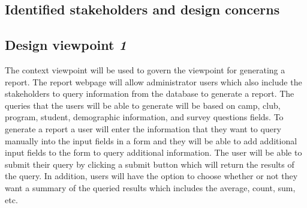 \documentclass[letterpaper,10pt,serif, draftclsnofoot,onecolumn, compsoc, titlepage]{IEEEtran}
\begin{document}
\subsection{Identified stakeholders and design concerns} 


\subsection{Design viewpoint \emph{1}}
The context viewpoint will be used to govern the viewpoint for generating a report. 
The report webpage will allow administrator users which also include the stakeholders to query information from the database to generate a report.
The queries that the users will be able to generate will be based on camp, club, program, student, demographic information, and survey questions fields. 
To generate a report a user will enter the information that they want to query manually into the input fields in a form and they will be able to add additional input fields to the form to query additional information.
The user will be able to submit their query by clicking a submit button which will return the results of the query. 
In addition, users will have the option to choose whether or not they want a summary of the queried results which includes the average, count, sum, etc. 
\end{document}
